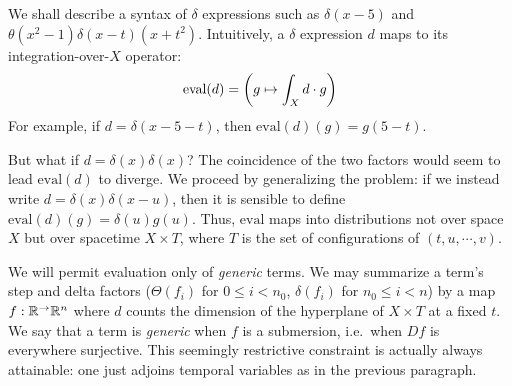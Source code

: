 
    We shall describe a syntax of $\delta$ expressions such as $\delta(x-5)$
    and $\theta(x^2-1)\delta(x-t)(x+t^2)$.
    Intuitively, a $\delta$ expression $d$ maps to
    its integration-over-$X$ operator:
    $$
        \text{eval}(d) = \left(g \mapsto \int_X d \cdot g\right)
    $$
    For example, if $d = \delta(x-5-t)$, then
    $\text{eval}(d)(g) = g(5-t)$. 

    But what if $d = \delta(x)\delta(x)$?  The coincidence of the two
    factors would seem to lead $\text{eval}(d)$ to diverge.  We proceed by
    generalizing the problem: if we instead write $d =
    \delta(x)\delta(x-u)$, then it is sensible to define
    $\text{eval}(d)(g) = \delta(u) g(u)$.  Thus,
    $\text{eval}$ maps into distributions not over space $X$ but over spacetime
    $X\times T$, where $T$ is the set of configurations of $(t,u, \cdots, v)$.

    We will permit evaluation only of \emph{generic} terms.  We may
    summarize a term's step and delta factors ($\Theta(f_i)$ for $0\leq i<n_0$,
    $\delta(f_i)$ for $n_0\leq i<n$)
    by a map $f:{\mathbb R}^\to {\mathbb R}^n$ where $d$ counts the dimension of the hyperplane
    of $X\times T$ at a fixed $t$.
    We say that a term is \emph{generic} when $f$ is a submersion,
    i.e.\ when $Df$ is everywhere surjective.  This seemingly restrictive
    constraint is actually always attainable: one just adjoins temporal
    variables as in the previous paragraph.

